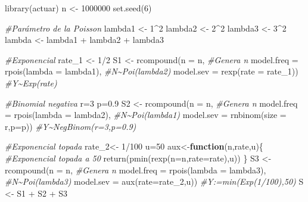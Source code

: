 \documentclass[
]{article}
\newenvironment{Shaded}{\begin{snugshade}}{\end{snugshade}}
\newcommand{\AttributeTok}[1]{\textcolor[rgb]{0.77,0.63,0.00}{#1}}
\newcommand{\CommentTok}[1]{\textcolor[rgb]{0.56,0.35,0.01}{\textit{#1}}}
\newcommand{\ControlFlowTok}[1]{\textcolor[rgb]{0.13,0.29,0.53}{\textbf{#1}}}
\newcommand{\DecValTok}[1]{\textcolor[rgb]{0.00,0.00,0.81}{#1}}
\newcommand{\FloatTok}[1]{\textcolor[rgb]{0.00,0.00,0.81}{#1}}
\newcommand{\FunctionTok}[1]{\textcolor[rgb]{0.00,0.00,0.00}{#1}}
\newcommand{\NormalTok}[1]{#1}
\newcommand{\OtherTok}[1]{\textcolor[rgb]{0.56,0.35,0.01}{#1}}
\newcommand{\SpecialCharTok}[1]{\textcolor[rgb]{0.00,0.00,0.00}{#1}}
\begin{document}
\begin{Shaded}
\begin{Highlighting}[]
\FunctionTok{library}\NormalTok{(actuar)}
\NormalTok{n }\OtherTok{\textless{}{-}} \DecValTok{1000000}
\FunctionTok{set.seed}\NormalTok{(}\DecValTok{6}\NormalTok{)}

\CommentTok{\#Parámetro de la Poisson}
\NormalTok{lambda1 }\OtherTok{\textless{}{-}} \DecValTok{1}\SpecialCharTok{\^{}}\DecValTok{2}
\NormalTok{lambda2 }\OtherTok{\textless{}{-}} \DecValTok{2}\SpecialCharTok{\^{}}\DecValTok{2}
\NormalTok{lambda3 }\OtherTok{\textless{}{-}} \DecValTok{3}\SpecialCharTok{\^{}}\DecValTok{2}
\NormalTok{lambda }\OtherTok{\textless{}{-}}\NormalTok{ lambda1 }\SpecialCharTok{+}\NormalTok{ lambda2 }\SpecialCharTok{+}\NormalTok{ lambda3}

\CommentTok{\#Exponencial}
\NormalTok{rate\_1 }\OtherTok{\textless{}{-}} \DecValTok{1}\SpecialCharTok{/}\DecValTok{2}
\NormalTok{S1 }\OtherTok{\textless{}{-}} \FunctionTok{rcompound}\NormalTok{(}\AttributeTok{n =}\NormalTok{ n, }\CommentTok{\#Genera n}
               \AttributeTok{model.freq =} \FunctionTok{rpois}\NormalTok{(}\AttributeTok{lambda =}\NormalTok{ lambda1), }\CommentTok{\#N\textasciitilde{}Poi(lambda2)}
               \AttributeTok{model.sev =} \FunctionTok{rexp}\NormalTok{(}\AttributeTok{rate =}\NormalTok{ rate\_1)) }\CommentTok{\#Y\textasciitilde{}Exp(rate) }

\CommentTok{\#Binomial negativa}
\NormalTok{r}\OtherTok{=}\DecValTok{3}
\NormalTok{p}\OtherTok{=}\FloatTok{0.9}
\NormalTok{S2 }\OtherTok{\textless{}{-}} \FunctionTok{rcompound}\NormalTok{(}\AttributeTok{n =}\NormalTok{ n, }\CommentTok{\#Genera n}
                \AttributeTok{model.freq =} \FunctionTok{rpois}\NormalTok{(}\AttributeTok{lambda =}\NormalTok{ lambda2), }\CommentTok{\#N\textasciitilde{}Poi(lambda1)}
                \AttributeTok{model.sev =} \FunctionTok{rnbinom}\NormalTok{(}\AttributeTok{size =}\NormalTok{ r,}\AttributeTok{p=}\NormalTok{p)) }\CommentTok{\#Y\textasciitilde{}NegBinom(r=3,p=0.9) }

\CommentTok{\#Exponencial topada}
\NormalTok{rate\_2}\OtherTok{\textless{}{-}} \DecValTok{1}\SpecialCharTok{/}\DecValTok{100}
\NormalTok{u}\OtherTok{=}\DecValTok{50}
\NormalTok{aux}\OtherTok{\textless{}{-}}\ControlFlowTok{function}\NormalTok{(n,rate,u)\{ }\CommentTok{\#Exponencial topada a 50}
  \FunctionTok{return}\NormalTok{(}\FunctionTok{pmin}\NormalTok{(}\FunctionTok{rexp}\NormalTok{(}\AttributeTok{n=}\NormalTok{n,}\AttributeTok{rate=}\NormalTok{rate),u))}
\NormalTok{\}}
\NormalTok{S3 }\OtherTok{\textless{}{-}} \FunctionTok{rcompound}\NormalTok{(}\AttributeTok{n =}\NormalTok{ n, }\CommentTok{\#Genera n}
                \AttributeTok{model.freq =} \FunctionTok{rpois}\NormalTok{(}\AttributeTok{lambda =}\NormalTok{ lambda3), }\CommentTok{\#N\textasciitilde{}Poi(lambda3)}
                \AttributeTok{model.sev =} \FunctionTok{aux}\NormalTok{(}\AttributeTok{rate=}\NormalTok{rate\_2,u)) }\CommentTok{\#Y:=min(Exp(1/100),50)}
\NormalTok{S }\OtherTok{\textless{}{-}}\NormalTok{ S1 }\SpecialCharTok{+}\NormalTok{ S2 }\SpecialCharTok{+}\NormalTok{ S3}


\end{Highlighting}
\end{Shaded}
\end{document}
